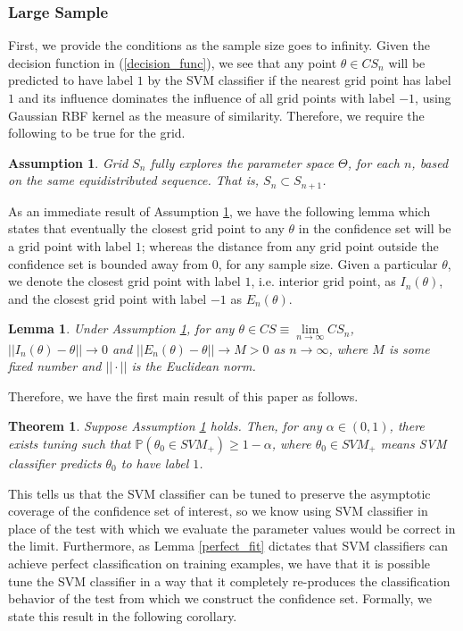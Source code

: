 \documentclass[12pt]{article}
\newtheorem{theorem}{Theorem}
\newtheorem{lemma}{Lemma}
\newtheorem{assumption}{Assumption}
\theoremstyle{definition}
\begin{document}
\subsubsection{Large Sample}
First, we provide the conditions as the sample size goes to infinity. Given the decision function in (\ref{decision_func}), we see that any point $\theta\in CS_n$ will be predicted to have label $1$ by the SVM classifier if the nearest grid point has label $1$ and its influence dominates the influence of all grid points with label $-1$, using Gaussian RBF kernel as the measure of similarity. Therefore, we require the following to be true for the grid.

\begin{assumption}\label{ass:grid}
Grid $S_n$ fully explores the parameter space $\Theta$, for each $n$, based on the same equidistributed sequence. That is, $S_n\subset S_{n+1}$.
\end{assumption}
\noindent
As an immediate result of Assumption \ref{ass:grid}, we have the following lemma which states that eventually the closest grid point to any $\theta$ in the confidence set will be a grid point with label $1$; whereas the distance from any grid point outside the confidence set is bounded away from 0, for any sample size. Given a particular $\theta$, we denote the closest grid point with label $1$, i.e. interior grid point, as $I_n(\theta)$, and the closest grid point with label $-1$ as $E_n(\theta)$.

\begin{lemma}\label{lemma2}
Under Assumption \ref{ass:grid}, for any $\theta\in CS\equiv \underset{n\to\infty}{\lim}CS_n$, $||I_n(\theta)-\theta||\to0$ and $||E_n(\theta)-\theta||\to M>0$ as $n\to\infty$, where $M$ is some fixed number and $||\cdot||$ is the Euclidean norm.
\end{lemma}

Therefore, we have the first main result of this paper as follows.

\begin{theorem} \label{thm1}
Suppose Assumption \ref{ass:grid} holds. Then, for any $\alpha\in(0,1)$, there exists tuning such that $\mathbb{P}(\theta_0\in SVM_+)\geq 1-\alpha$, where $\theta_0\in SVM_+$ means SVM classifier predicts $\theta_0$ to have label $1$.
\end{theorem}
\noindent
This tells us that the SVM classifier can be tuned to preserve the asymptotic coverage of the confidence set of interest, so we know using SVM classifier in place of the test with which we evaluate the parameter values would be correct in the limit. Furthermore, as Lemma \ref{perfect_fit} dictates that SVM classifiers can achieve perfect classification on training examples, we have that it is possible tune the SVM classifier in a way that it completely re-produces the classification behavior of the test from which we construct the confidence set. Formally, we state this result in the following corollary.
\end{document}
